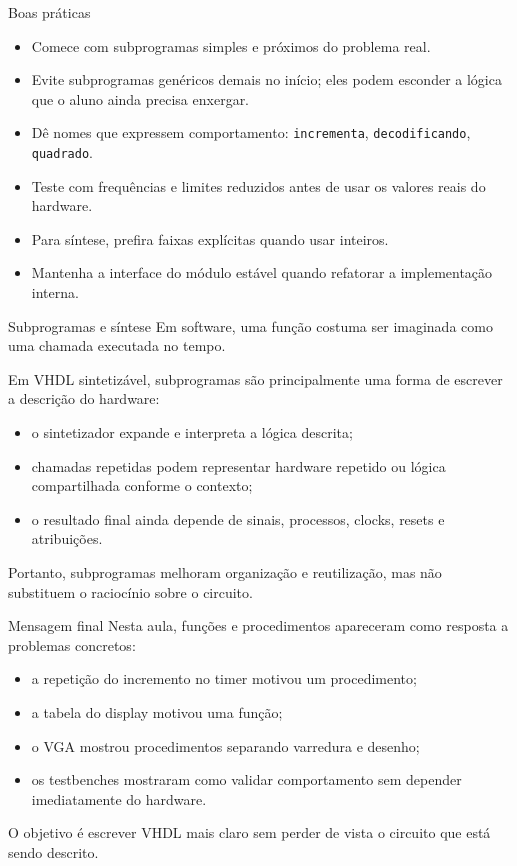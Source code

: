 \documentclass[aspectratio=169,11pt]{beamer}
\begin{document}
\begin{frame}{Boas práticas}
    \begin{itemize}
        \item Comece com subprogramas simples e próximos do problema real.
        \item Evite subprogramas genéricos demais no início; eles podem esconder a lógica que o aluno ainda precisa enxergar.
        \item Dê nomes que expressem comportamento: \texttt{incrementa}, \texttt{decodificando}, \texttt{quadrado}.
        \item Teste com frequências e limites reduzidos antes de usar os valores reais do hardware.
        \item Para síntese, prefira faixas explícitas quando usar inteiros.
        \item Mantenha a interface do módulo estável quando refatorar a implementação interna.
    \end{itemize}
\end{frame}

\begin{frame}{Subprogramas e síntese}
    Em software, uma função costuma ser imaginada como uma chamada executada no tempo.

    \vspace{0.5em}
    Em VHDL sintetizável, subprogramas são principalmente uma forma de escrever a descrição do hardware:
    \begin{itemize}
        \item o sintetizador expande e interpreta a lógica descrita;
        \item chamadas repetidas podem representar hardware repetido ou lógica compartilhada conforme o contexto;
        \item o resultado final ainda depende de sinais, processos, clocks, resets e atribuições.
    \end{itemize}

    \vspace{0.5em}
    Portanto, subprogramas melhoram organização e reutilização, mas não substituem o raciocínio sobre o circuito.
\end{frame}

\begin{frame}{Mensagem final}
    Nesta aula, funções e procedimentos apareceram como resposta a problemas concretos:
    \begin{itemize}
        \item a repetição do incremento no timer motivou um procedimento;
        \item a tabela do display motivou uma função;
        \item o VGA mostrou procedimentos separando varredura e desenho;
        \item os testbenches mostraram como validar comportamento sem depender imediatamente do hardware.
    \end{itemize}

    \vspace{0.5em}
    O objetivo é escrever VHDL mais claro sem perder de vista o circuito que está sendo descrito.
\end{frame}
\end{document}
